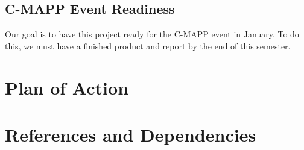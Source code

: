 \documentclass[titlepage,12pt]{article}
\begin{document}
\subsection{C-MAPP Event Readiness}
Our goal is to have this project ready for the C-MAPP event in January. To do
this, we must have a finished product and report by the end of this semester.

\section{Plan of Action}

\section{References and Dependencies}
\end{document}
